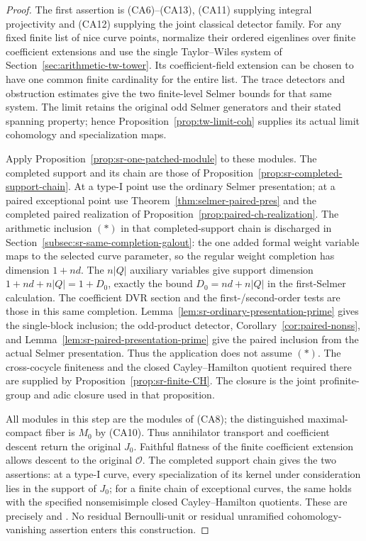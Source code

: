 \begin{proof}
The first assertion is (CA6)--(CA13), (CA11) supplying
integral projectivity and (CA12) supplying the joint
classical detector family.
For any fixed finite list of nice curve points, normalize
their ordered eigenlines over finite coefficient
extensions and use the single Taylor--Wiles system of
Section~\ref{sec:arithmetic-tw-tower}.
Its coefficient-field extension can be chosen to have
one common finite cardinality for the entire list.
The trace detectors and obstruction estimates give
the two finite-level Selmer bounds for that same
system. The limit retains the original odd Selmer
generators and their stated spanning property; hence
Proposition~\ref{prop:tw-limit-coh} supplies its actual
limit cohomology and specialization maps.

Apply Proposition~\ref{prop:sr-one-patched-module} to
these modules. The completed support and its chain
are those of Proposition~\ref{prop:sr-completed-support-chain}.
At a type-I point use the ordinary Selmer presentation;
at a paired exceptional point use
Theorem~\ref{thm:selmer-paired-pres} and the completed
paired realization of Proposition~\ref{prop:paired-ch-realization}.
The arithmetic inclusion \((*)\) in that completed-support
chain is discharged in
Section~\ref{subsec:sr-same-completion-galout}:
the one added formal weight variable maps to the selected
curve parameter, so the regular weight completion has
dimension \(1+nd\). The \(n|Q|\) auxiliary variables
give support dimension \(1+nd+n|Q|=1+D_0\), exactly the
bound \(D_0=nd+n|Q|\) in the first-Selmer calculation.
The coefficient DVR section and the first-/second-order
tests are those in this same completion.
Lemma~\ref{lem:sr-ordinary-presentation-prime} gives the
single-block inclusion; the odd-product detector,
Corollary~\ref{cor:paired-nonss}, and
Lemma~\ref{lem:sr-paired-presentation-prime} give the
paired inclusion from the actual Selmer presentation.
Thus the application does not assume \((*)\).
The cross-cocycle finiteness and the closed
Cayley--Hamilton quotient required there are supplied
by Proposition~\ref{prop:sr-finite-CH}.
The closure is the joint profinite-group and adic
closure used in that proposition.

All modules in this step are the modules of (CA8);
the distinguished maximal-compact fiber is \(M_0\)
by (CA10). Thus annihilator transport and coefficient
descent return the original \(J_0\).
Faithful flatness of the finite coefficient extension
allows descent to the original \(\mathcal O\).
The completed support chain gives the two assertions:
at a type-I curve, every specialization of its kernel
under consideration lies in the support of \(J_0\);
for a finite chain of exceptional curves, the same
holds with the specified nonsemisimple closed
Cayley--Hamilton quotients. These are precisely
 and .
No residual Bernoulli-unit or residual unramified
cohomology-vanishing assertion enters this construction.
\end{proof}


